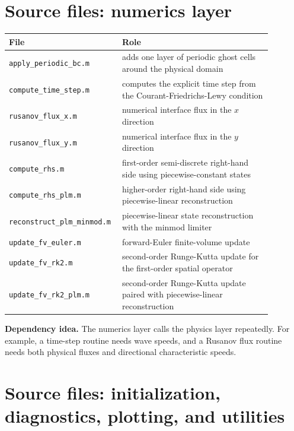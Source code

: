 \documentclass[11pt]{article}
\begin{document}
\section{Source files: numerics layer}
\begin{center}
\begin{tabular}{p{0.33\linewidth} p{0.55\linewidth}}
\toprule
\textbf{File} & \textbf{Role} \\
\midrule
\texttt{apply\_periodic\_bc.m} & adds one layer of periodic ghost cells around the physical domain \\
\texttt{compute\_time\_step.m} & computes the explicit time step from the Courant-Friedrichs-Lewy condition \\
\texttt{rusanov\_flux\_x.m} & numerical interface flux in the $x$ direction \\
\texttt{rusanov\_flux\_y.m} & numerical interface flux in the $y$ direction \\
\texttt{compute\_rhs.m} & first-order semi-discrete right-hand side using piecewise-constant states \\
\texttt{compute\_rhs\_plm.m} & higher-order right-hand side using piecewise-linear reconstruction \\
\texttt{reconstruct\_plm\_minmod.m} & piecewise-linear state reconstruction with the minmod limiter \\
\texttt{update\_fv\_euler.m} & forward-Euler finite-volume update \\
\texttt{update\_fv\_rk2.m} & second-order Runge-Kutta update for the first-order spatial operator \\
\texttt{update\_fv\_rk2\_plm.m} & second-order Runge-Kutta update paired with piecewise-linear reconstruction \\
\bottomrule
\end{tabular}
\end{center}

\begin{implbox}
\textbf{Dependency idea.} The numerics layer calls the physics layer repeatedly. For example, a time-step routine needs wave speeds, and a Rusanov flux routine needs both physical fluxes and directional characteristic speeds.
\end{implbox}

\section{Source files: initialization, diagnostics, plotting, and utilities}
\end{document}
